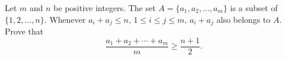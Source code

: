 Let $m$ and $n$ be positive integers. The set $A = \{a_1, a_2, \ldots, a_m\}$ is a subset of $\{1, 2, \ldots, n\}$. Whenever $a_i + a_j \leq n$, $1 \leq i \leq j \leq m$, $a_i + a_j$ also belongs to $A$. Prove that
\[
\frac{a_1 + a_2 + \cdots + a_m}{m} \geq \frac{n+1}{2}.
\]
